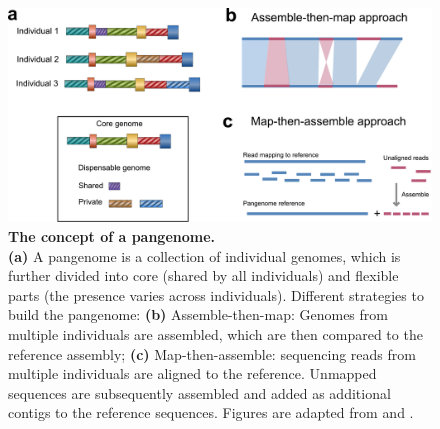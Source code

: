 \documentclass[../main.tex]{subfiles}
\begin{document}
\begin{figure}[!htb]
    \centering
    \includegraphics[width=\textwidth]{intro/fig3.pdf}
        \vspace{3mm}
        \caption[The concept of a pangenomes]{\textbf{The concept of a pangenome.} \\
        \footnotesize{\textbf{(a)} A pangenome is a collection of individual genomes, which is further divided into core (shared by all individuals) and flexible parts (the presence varies across individuals). Different strategies to build the pangenome: \textbf{(b)} Assemble-then-map: Genomes from multiple individuals are assembled, which are then compared to the reference assembly; \textbf{(c)} Map-then-assemble: sequencing reads from multiple individuals are aligned to the reference. Unmapped sequences are subsequently assembled and added as additional contigs to the reference sequences. Figures are adapted from \citep{sherman2020pan} and \citep{bayer2020plant}.}}
        \label{fig13:pan}
\end{figure}
\end{document}
